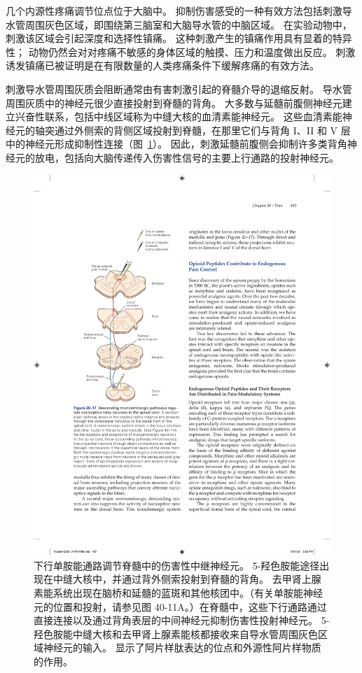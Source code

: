 几个内源性疼痛调节位点位于大脑中。
抑制伤害感受的一种有效方法包括刺激导水管周围灰色区域，即围绕第三脑室和大脑导水管的中脑区域。
在实验动物中，刺激该区域会引起深度和选择性镇痛。
这种刺激产生的镇痛作用具有显着的特异性；
动物仍然会对对疼痛不敏感的身体区域的触摸、压力和温度做出反应。
刺激诱发镇痛已被证明是在有限数量的人类疼痛条件下缓解疼痛的有效方法。


刺激导水管周围灰质会阻断通常由有害刺激引起的脊髓介导的退缩反射。
导水管周围灰质中的神经元很少直接投射到脊髓的背角。 
大多数与延髓前腹侧神经元建立兴奋性联系，包括中线区域称为中缝大核的血清素能神经元。
这些血清素能神经元的轴突通过外侧索的背侧区域投射到脊髓，在那里它们与背角 I、II 和 V 层中的神经元形成抑制性连接（图~\ref{fig:20_17}）。
因此，刺激延髓前腹侧会抑制许多类背角神经元的放电，包括向大脑传递传入伤害性信号的主要上行通路的投射神经元。


\begin{figure}[htbp]
	\centering
	\includegraphics[width=0.7\linewidth]{chap20/fig_20_17}
	\caption{下行单胺能通路调节脊髓中的伤害性中继神经元。
		5-羟色胺能途径出现在中缝大核中，并通过背外侧索投射到脊髓的背角。
		去甲肾上腺素能系统出现在脑桥和延髓的蓝斑和其他核团中。（有关单胺能神经元的位置和投射，请参见图 40-11A。）在脊髓中，这些下行通路通过直接连接以及通过背角表层的中间神经元抑制伤害性投射神经元。
		5-羟色胺能中缝大核和去甲肾上腺素能核都接收来自导水管周围灰色区域神经元的输入。
		显示了阿片样肽表达的位点和外源性阿片样物质的作用。}
	\label{fig:20_17}
\end{figure}


